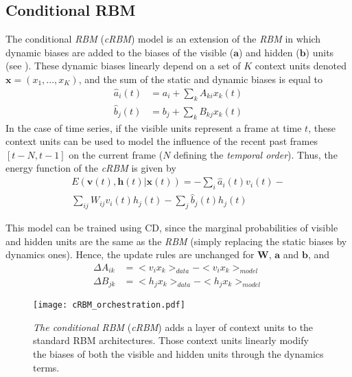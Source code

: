 \documentclass{amsart}
\begin{document}
	\subsection{Conditional RBM}
	The conditional \textit{RBM} (\textit{cRBM}) model \cite{taylor2009factored} is an extension of the \textit{RBM} in which dynamic biases are added to the biases of the visible ($\bm{a}$) and hidden ($\bm{b}$) units (see ). These dynamic biases linearly depend on a set of $K$ context units denoted $\bm{x} = (x_{1},...,x_{K})$, and the sum of the static and dynamic biases is equal to
	\begin{align*}
	\hat{a}_{i}(t) &= a_{i} + \sum_{k}A_{ki}x_{k}(t)\\
	\hat{b}_{j}(t) &= b_{j} + \sum_{k}B_{kj}x_{k}(t)
	\end{align*}
	In the case of time series, if the visible units represent a frame at time $t$, these context units can be used to model the influence of the recent past frames $\left[ t-N, t-1 \right]$ on the current frame ($N$ defining the \textit{temporal order}).
	Thus, the energy function of the \textit{cRBM} is given by
	\begin{equation}
	\begin{split}
	\label{eq:energy_cRBM}
	E(\bm{v}(t),\bm{h}(t)|\bm{x}(t)) =  - \sum_{i} \hat{a}_{i}(t)v_{i}(t) - \\ \sum_{ij}W_{ij}v_{i}(t)h_{j}(t) - \sum_{j} \hat{b}_{j}(t)h_{j}(t)
	\end{split}
	\end{equation}
	
	This model can be trained using CD, since the marginal probabilities of visible and hidden units are the same as the \textit{RBM} (simply replacing the static biases by dynamics ones).
	Hence, the update rules are unchanged for $\bm{W}$, $\bm{a}$ and $\bm{b}$, and
	\begin{align}
	\Delta A_{ik} 	&=<v_{i}x_{k} >_{data} - <v_{i}x_{k} >_{model}\\
	\Delta B_{jk} 	&= <h_{j}x_{k} >_{data} - <h_{j}x_{k} >_{model}
	\end{align}
	
	\begin{figure}[ht]
		\centering
		\texttt{[image: cRBM\_orchestration.pdf]}
		\caption{\textit{The conditional RBM} (\textit{cRBM}) adds a layer of context units to the standard RBM architectures. Those context units linearly modify the biases of both the visible and hidden units through the dynamics terms.}
		\label{fig:cRBM_orchestration}
	\end{figure}
	
\end{document}

